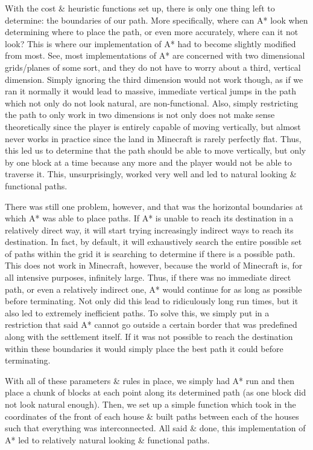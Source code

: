 \documentclass[11pt, oneside]{article}
\begin{document}
\begin{normalsize}
With the cost \& heuristic functions set up, there is only one thing left to determine: the boundaries of our path. 
More specifically, where can A* look when determining where to place the path, or even more accurately, where can it not look? 
This is where our implementation of A* had to become slightly modified from most. 
See, most implementations of A* are concerned with two dimensional grids/planes of some sort, and they do not have to worry about a third, vertical dimension. 
Simply ignoring the third dimension would not work though, as if we ran it normally it would lead to massive, immediate vertical jumps in the path which not only do not look natural, are non-functional. 
Also, simply restricting the path to only work in two dimensions is not only does not make sense theoretically since the player is entirely capable of moving vertically, but almost never works in practice since the land in Minecraft is rarely perfectly flat. 
Thus, this led us to determine that the path should be able to move vertically, but only by one block at a time because any more and the player would not be able to traverse it. 
This, unsurprisingly, worked very well and led to natural looking \& functional paths. 

There was still one problem, however, and that was the horizontal boundaries at which A* was able to place paths. 
If A* is unable to reach its destination in a relatively direct way, it will start trying increasingly indirect ways to reach its destination. 
In fact, by default, it will exhaustively search the entire possible set of paths within the grid it is searching to determine if there is a possible path. 
This does not work in Minecraft, however, because the world of Minecraft is, for all intensive purposes, infinitely large. 
Thus, if there was no immediate direct path, or even a relatively indirect one, A* would continue for as long as possible before terminating. 
Not only did this lead to ridiculously long run times, but it also led to extremely inefficient paths. 
To solve this, we simply put in a restriction that said A* cannot go outside a certain border that was predefined along with the settlement itself. 
If it was not possible to reach the destination within these boundaries it would simply place the best path it could before terminating. 

With all of these parameters \& rules in place, we simply had A* run and then place a chunk of blocks at each point along its determined path (as one block did not look natural enough). 
Then, we set up a simple function which took in the coordinates of the front of each house \& built paths between each of the houses such that everything was interconnected. 
All said \& done, this implementation of A* led to relatively natural looking \& functional paths. 


\end{normalsize}
\end{document}
